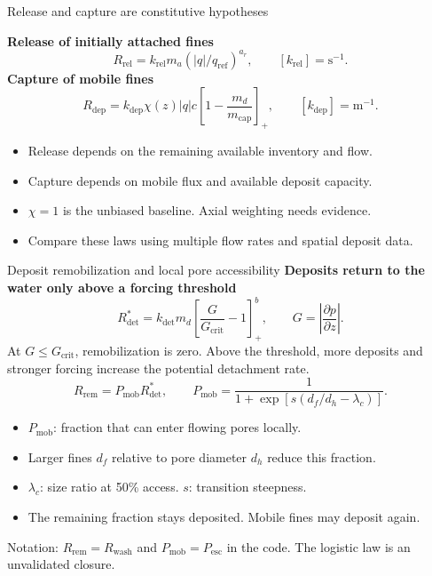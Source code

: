 \documentclass[aspectratio=169,11pt]{beamer}
\newcommand{\hi}[1]{\textcolor{tumblue}{\textbf{#1}}}
\newcommand{\slidesource}[1]{\par\vfill{\tiny\color{tumgray}#1}}
\begin{document}
\begin{frame}{Release and capture are constitutive hypotheses}
\small

\hi{Release of initially attached fines}
\[
R_{\mathrm{rel}}=k_{\mathrm{rel}}m_a(|q|/q_{\mathrm{ref}})^{a_r},
\qquad [k_{\mathrm{rel}}]=\mathrm{s^{-1}}.
\]
\hi{Capture of mobile fines}
\[
R_{\mathrm{dep}}=k_{\mathrm{dep}}\chi(z)|q|c
\left[1-\frac{m_d}{m_{\mathrm{cap}}}\right]_+,
\qquad[k_{\mathrm{dep}}]=\mathrm{m^{-1}}.
\]
\begin{itemize}
\item Release depends on the remaining available inventory and flow.
\item Capture depends on mobile flux and available deposit capacity.
\item $\chi=1$ is the unbiased baseline. Axial weighting needs evidence.
\item Compare these laws using multiple flow rates and spatial deposit data.
\end{itemize}

\end{frame}

\begin{frame}{Deposit remobilization and local pore accessibility}
\small
\hi{Deposits return to the water only above a forcing threshold}
\[
R_{\mathrm{det}}^*=k_{\mathrm{det}}m_d
\left[\frac{G}{G_{\mathrm{crit}}}-1\right]_+^b,\qquad
G=\left|\frac{\partial p}{\partial z}\right|.
\]
At $G\leq G_{\mathrm{crit}}$, remobilization is zero. Above the threshold,
more deposits and stronger forcing increase the potential detachment rate.
\[
R_{\mathrm{rem}}=P_{\mathrm{mob}}R_{\mathrm{det}}^*,\qquad
P_{\mathrm{mob}}=\frac{1}{1+\exp[s(d_f/d_h-\lambda_c)]}.
\]
\begin{itemize}
\item $P_{\mathrm{mob}}$: fraction that can enter flowing pores locally.
\item Larger fines $d_f$ relative to pore diameter $d_h$ reduce this fraction.
\item $\lambda_c$: size ratio at 50\% access. $s$: transition steepness.
\item The remaining fraction stays deposited. Mobile fines may deposit again.
\end{itemize}
\slidesource{Notation: $R_{\mathrm{rem}}=R_{\mathrm{wash}}$ and $P_{\mathrm{mob}}=P_{\mathrm{esc}}$ in the code. The logistic law is an unvalidated closure.}
\end{frame}
\end{document}

